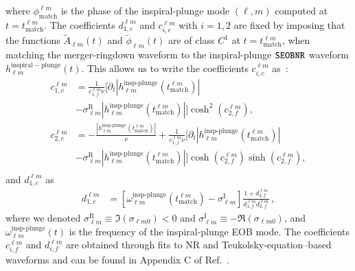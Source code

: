 %
where $ \phi_{\textrm{match}}^{\ell m}$ is the phase of the inspiral-plunge mode $(\ell, m)$ computed at $t = t_{\textrm{match}}^{\ell m}$. The coefficients $d_{1,c}^{\ell m}$ and $c_{i,c}^{\ell m}$ with $i = 1,2$
are fixed by imposing that the functions $\tilde{A}_{\ell m}(t)$ and $\tilde{\phi}_{\ell m}(t)$ are of class $C^1$ at $t = t_{\textrm{match}}^{\ell m}$, when matching the merger-ringdown waveform to the inspiral-plunge $\texttt{SEOBNR}$ waveform $h_{\ell m}^\mathrm{inspiral-plunge}(t)$. This allows us to write the coefficients $c_{i,c}^{\ell m}$ as~\cite{Cotesta:2018fcv}:
%
\begin{subequations}
\begin{align}
\label{c1}
c_{1,c}^{\ell m} &= \frac{1}{c_{1,f}^{\ell
    m} \nu} \big[ \partial_t|h_{\ell
    m}^{\textrm{insp-plunge}}(t_{\textrm{match}}^{\ell m})| \nonumber \\
    &- \sigma^\textrm{R}_{\ell m} |h_{\ell
    m}^{\textrm{insp-plunge}}(t_{\textrm{match}}^{\ell
    m})|\big] \cosh^2{(c_{2,f}^{\ell m})}, \\
\label{c2}
c_{2,c}^{\ell m} &= -\frac{ |h_{\ell
    m}^{\textrm{insp-plunge}}(t_{\textrm{match}}^{\ell
    m})|}{\nu} + \frac{1}{c_{1,f}^{\ell
    m} \nu} \big[ \partial_t|h_{\ell
    m}^{\textrm{insp-plunge}}(t_{\textrm{match}}^{\ell m})|  \nonumber \\
    &- \sigma^\textrm{R}_{\ell m} |h_{\ell
    m}^{\textrm{insp-plunge}}(t_{\textrm{match}}^{\ell
    m})|\big] \cosh{(c_{2,f}^{\ell m})}\sinh{(c_{2,f}^{\ell m})}, \\ \nonumber
\end{align}
\end{subequations}
and $d_{1,c}^{\ell m}$ as
\begin{align}
\label{d1}
d_{1,c}^{\ell m} &= \left[\omega_{\ell m}^{\textrm{insp-plunge}}(t_{\textrm{match}}^{\ell m}) -  \sigma^\textrm{I}_{\ell
      m}\right]\frac{1+ d_{2,f}^{\ell m}}{d_{1,f}^{\ell m}d_{2,f}^{\ell m}}\,,
\end{align}
%
where we denoted $\sigma_{\ell m}^\textrm{R} \equiv \Im (\sigma_{\ell m0}) < 0$ and  $\sigma_{\ell m}^\textrm{I} \equiv -\Re (\sigma_{\ell m0})$, and $\omega_{\ell m}^{\textrm{insp-plunge}}(t)$ is the frequency of the inspiral-plunge EOB mode. The coefficients $c_{i,f}^{\ell m}$ and $d_{i,f}^{\ell m}$ are obtained through fits to NR and
Teukolsky-equation--based waveforms and can be found in Appendix C of Ref.~\cite{Cotesta:2018fcv}.


